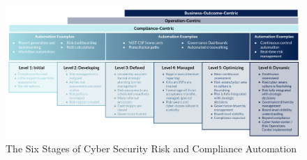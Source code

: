 \fancyheadoffset{0pt}%


\begin{figure}[h!] 
\centering
\includegraphics{./figures/fig5.png}
\caption{The Six Stages of Cyber Security Risk and Compliance Automation}
\label{fig:Fig5}
\end{figure}

\cleardoublepage

\restoregeometry
\fancyheadoffset{0pt}